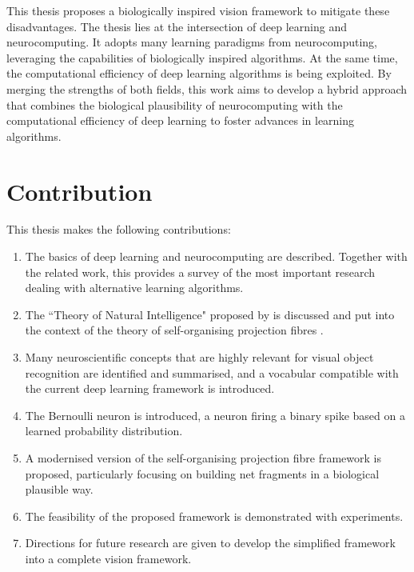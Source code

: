 This thesis proposes a biologically inspired vision framework to mitigate these disadvantages. 
The thesis lies at the intersection of deep learning and neurocomputing. It adopts many learning paradigms from neurocomputing, leveraging the capabilities of biologically inspired algorithms. At the same time, the computational efficiency of deep learning algorithms is being exploited. By merging the strengths of both fields, this work aims to develop a hybrid approach that combines the biological plausibility of neurocomputing with the computational efficiency of deep learning to foster advances in learning algorithms.


\section{Contribution}
This thesis makes the following contributions:
\begin{enumerate}
	\item The basics of deep learning and neurocomputing are described. Together with the related work, this provides a survey of the most important research dealing with alternative learning algorithms.
	\item The ``Theory of Natural Intelligence" proposed by  is discussed and put into the context of the theory of self-organising projection fibres .
    \item Many neuroscientific concepts that are highly relevant for visual object recognition are identified and summarised, and a vocabular compatible with the current deep learning framework is introduced.
	\item The Bernoulli neuron is introduced, a neuron firing a binary spike based on a learned probability distribution.
	\item A modernised version of the self-organising projection fibre framework is proposed, particularly focusing on building net fragments in a biological plausible way.
    \item The feasibility of the proposed framework is demonstrated with experiments.
    \item Directions for future research are given to develop the simplified framework into a complete vision framework.
\end{enumerate}


